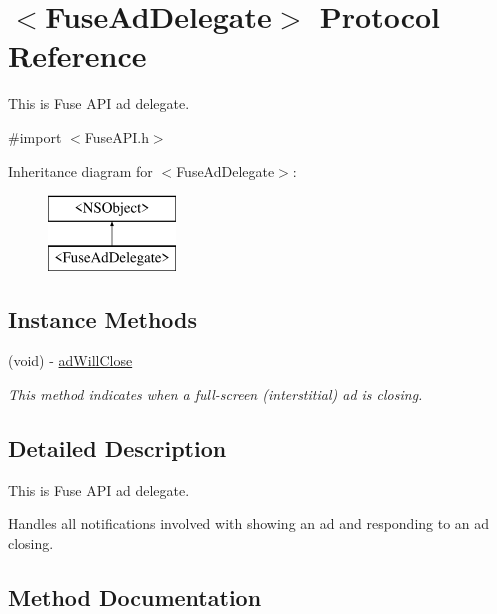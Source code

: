 \hypertarget{protocol_fuse_ad_delegate-p}{}\section{$<$Fuse\+Ad\+Delegate$>$ Protocol Reference}
\label{protocol_fuse_ad_delegate-p}


This is Fuse A\+P\+I ad delegate.  




{\ttfamily \#import $<$Fuse\+A\+P\+I.\+h$>$}

Inheritance diagram for $<$Fuse\+Ad\+Delegate$>$\+:\begin{figure}[H]
\begin{center}
\leavevmode
\includegraphics[height=2.000000cm]{protocol_fuse_ad_delegate-p}
\end{center}
\end{figure}
\subsection*{Instance Methods}
\begin{DoxyCompactItemize}
\item 
(void) -\/ \hyperlink{protocol_fuse_ad_delegate-p_aafc293cd46be3bd70eeb60971b961a51}{ad\+Will\+Close}
\begin{DoxyCompactList}\small\item\em This method indicates when a full-\/screen (interstitial) ad is closing. \end{DoxyCompactList}\end{DoxyCompactItemize}


\subsection{Detailed Description}
This is Fuse A\+P\+I ad delegate. 

Handles all notifications involved with showing an ad and responding to an ad closing. 

\subsection{Method Documentation}
\hypertarget{protocol_fuse_ad_delegate-p_aafc293cd46be3bd70eeb60971b961a51}{}
